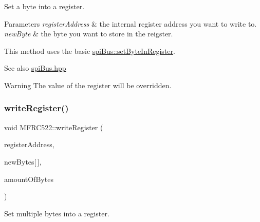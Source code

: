 Set a byte into a register. 


\begin{DoxyParams}{Parameters}
{\em register\+Address} & the internal register address you want to write to. \\
\hline
{\em new\+Byte} & the byte you want to store in the reigster.\\
\hline
\end{DoxyParams}
This method uses the basic \mbox{\hyperlink{classspi_bus_a3322a039f33a7180a9a57da662607b7d}{spi\+Bus\+::set\+Byte\+In\+Register}}. \begin{DoxySeeAlso}{See also}
\mbox{\hyperlink{spi_bus_8hpp_source}{spi\+Bus.\+hpp}} 
\end{DoxySeeAlso}
\begin{DoxyWarning}{Warning}
The value of the register will be overridden. 
\end{DoxyWarning}
\mbox{\label{class_m_f_r_c522_a3558d379575863072c711721b061bb75}} 
\subsubsection{\texorpdfstring{write\+Register()}{writeRegister()}\hspace{0.1cm}{\footnotesize\ttfamily [2/2]}}
{\footnotesize\ttfamily void M\+F\+R\+C522\+::write\+Register (\begin{DoxyParamCaption}\item[{\mbox{\hyperlink{class_m_f_r_c522_ae7ec09eb8c9c61288a4770175b4b8db7}{R\+EG}}}]{register\+Address,  }\item[{uint8\+\_\+t}]{new\+Bytes\mbox{[}$\,$\mbox{]},  }\item[{int}]{amount\+Of\+Bytes }\end{DoxyParamCaption})\hspace{0.3cm}{\ttfamily [protected]}}



Set multiple bytes into a register. 


